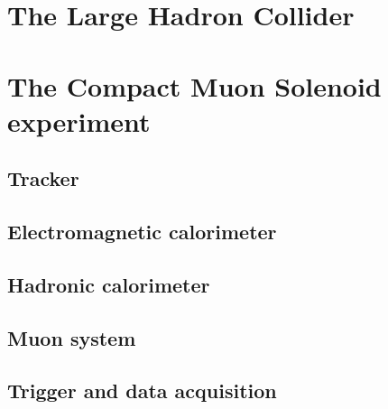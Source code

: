 \label{sec:CMS}
\section{The Large Hadron Collider}
\section{The Compact Muon Solenoid experiment}
\subsection{Tracker}
\subsection{Electromagnetic calorimeter}
\subsection{Hadronic calorimeter}
\subsection{Muon system}
\subsection{Trigger and data acquisition}
